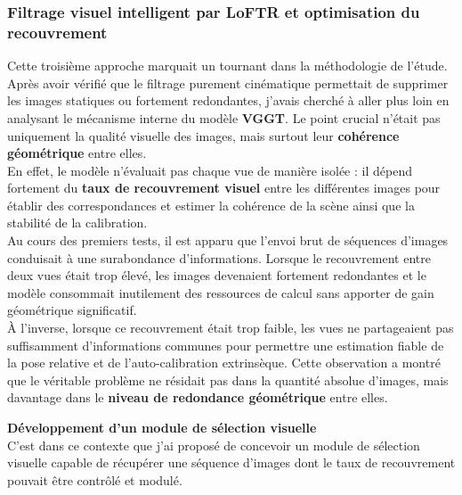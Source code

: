 \documentclass[12pt,a4paper,oneside]{report}
\begin{document}
\newpage

\subsubsection{Filtrage visuel intelligent par LoFTR et optimisation du recouvrement}

\hspace*{0.3cm}Cette troisième approche marquait un tournant dans la méthodologie de l'étude. Après avoir vérifié que le filtrage purement cinématique permettait de supprimer les images statiques ou fortement redondantes, j'avais cherché à aller plus loin en analysant le mécanisme interne du modèle \textbf{VGGT}. Le point crucial n'était pas uniquement la qualité visuelle des images, mais surtout leur \textbf{cohérence géométrique} entre elles.\\
En effet, le modèle n'évaluait pas chaque vue de manière isolée : il dépend fortement du \textbf{taux de recouvrement visuel} entre les différentes images pour établir des correspondances et estimer la cohérence de la scène ainsi que la stabilité de la calibration.\\

\hspace*{.3cm}Au cours des premiers tests, il est apparu que l'envoi brut de séquences d'images conduisait à une surabondance d'informations. Lorsque le recouvrement entre deux vues était trop élevé, les images devenaient fortement redondantes et le modèle consommait inutilement des ressources de calcul sans apporter de gain géométrique significatif.\\

\hspace*{.3cm}À l'inverse, lorsque ce recouvrement était trop faible, les vues ne partageaient pas suffisamment d'informations communes pour permettre une estimation fiable de la pose relative et de l'auto-calibration extrinsèque. Cette observation a montré que le véritable problème ne résidait pas dans la quantité absolue d'images, mais davantage dans le \textbf{niveau de redondance géométrique} entre elles.\\

\par\bigskip
\par\bigskip

\hspace*{0.4cm}\textbf{Développement d'un module de sélection visuelle}\\

\hspace*{.3cm}C'est dans ce contexte que j'ai proposé de concevoir un module de sélection visuelle capable de récupérer une séquence d'images dont le taux de recouvrement pouvait être contrôlé et modulé.\\
\end{document}
